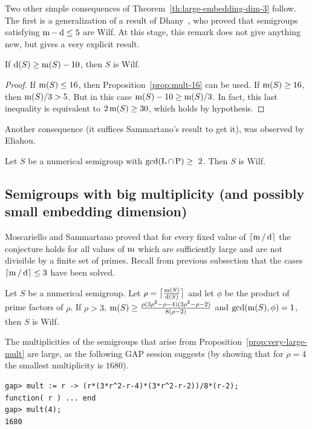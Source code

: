 Two other simple consequences of Theorem~\ref{th:large-embedding-dim-3} follow. The first is a generalization of a result of Dhany~\cite[Th.~4.9]{Dhayni2018PJM-Wilfs}, who proved that semigroups satisfying $\operatorname{m}-\operatorname{d}\le 5$ are Wilf. At this stage, this remark does not give anything new, but gives a very explicit result.
\begin{remark}
	If $\operatorname{d}(S)\ge\operatorname{m}(S)-10$, then $S$ is Wilf.
\end{remark}
\begin{proof}
	If $\operatorname{m}(S)\le 16$, then Proposition~\ref{prop:mult-16} can be used.
	If $\operatorname{m}(S)\ge 16$, then $\operatorname{m}(S)/3 > 5$. But in this case $\operatorname{m}(S) - 10 \ge \operatorname{m}(S)/3$. In fact, this last inequality is equivalent to $2\operatorname{m}(S) \ge 30$, which holds by hypothesis.
\end{proof}

Another consequence (it suffices Sammartano's result to get it), was observed by Eliahou.
\begin{proposition}
	Let $S$ be a numerical semigroup with $\gcd(\operatorname{L}\cap \operatorname{P}) \ge~2$. Then $S$ is Wilf.
\end{proposition}

\subsection{Semigroups with big multiplicity (and possibly small embedding dimension)}
Moscariello and Sammartano proved that for every fixed value of $\lceil \operatorname{m}/\operatorname{d}\rceil$ the conjecture holds for all values of $\operatorname{m}$ which are sufficiently large and are not divisible by a finite set of primes. Recall from previous subsection that the cases $\lceil \operatorname{m}/\operatorname{d}\rceil\le 3$ have been solved. 
\begin{proposition}\label{prop:very-large-mult}
	Let $S$ be a numerical semigroup. Let $\rho=\big\lceil \frac{\operatorname{m}(S)}{\operatorname{d}(S)}\big\rceil$ and let $\phi$ be the product of prime factors of $\rho$. If $\rho>3$, $\operatorname{m}(S)\ge\frac{\rho(3\rho^2-\rho-4)(3\rho^2-\rho-2)}{8(\rho-2)}$ and $\gcd(\operatorname{m}(S),\phi)=1$, then $S$ is Wilf. 
\end{proposition}
The multiplicities of the semigroups that arise from Proposition~\ref{prop:very-large-mult} are large, as the following \textsf{GAP} session suggests (by showing that for $\rho=4$ the smallest multiplicity is $1680$).
\begin{verbatim}
gap> mult := r -> (r*(3*r^2-r-4)*(3*r^2-r-2))/8*(r-2);
function( r ) ... end
gap> mult(4);
1680
\end{verbatim}


